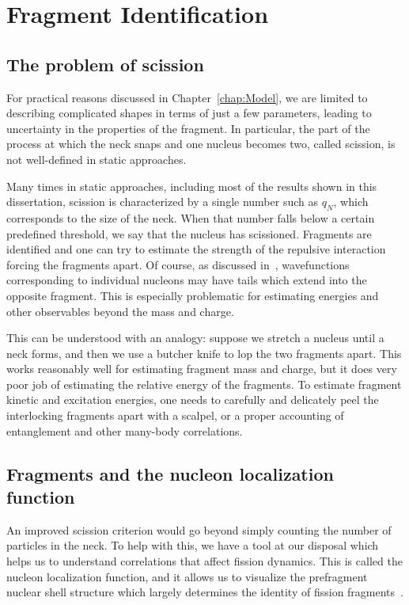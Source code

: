 \chapter{Fragment Identification}\label{append:Fragments}

\section{The problem of scission}
For practical reasons discussed in Chapter~\ref{chap:Model}, we are limited to describing complicated shapes in terms of just a few parameters, leading to uncertainty in the properties of the fragment. In particular, the part of the process at which the neck snaps and one nucleus becomes two, called scission, is not well-defined in static approaches.

Many times in static approaches, including most of the results shown in this dissertation, scission is characterized by a single number such as $q_N$, which corresponds to the size of the neck. When that number falls below a certain predefined threshold, we say that the nucleus has scissioned. Fragments are identified and one can try to estimate the strength of the repulsive interaction forcing the fragments apart. Of course, as discussed in~\cite{Bonneau2007,Younes2011}, wavefunctions corresponding to individual nucleons may have tails which extend into the opposite fragment. This is especially problematic for estimating energies and other observables beyond the mass and charge.

This can be understood with an analogy: suppose we stretch a nucleus until a neck forms, and then we use a butcher knife to lop the two fragments apart. This works reasonably well for estimating fragment mass and charge, but it does very poor job of estimating the relative energy of the fragments. To estimate fragment kinetic and excitation energies, one needs to carefully and delicately peel the interlocking fragments apart with a scalpel, or a proper accounting of entanglement and other many-body correlations.


\section{Fragments and the nucleon localization function}
An improved scission criterion would go beyond simply counting the number of particles in the neck. To help with this, we have a tool at our disposal which helps us to understand correlations that affect fission dynamics. This is called the nucleon localization function, and it allows us to visualize the prefragment nuclear shell structure which largely determines the identity of fission fragments~\cite{Zhang2016}.

